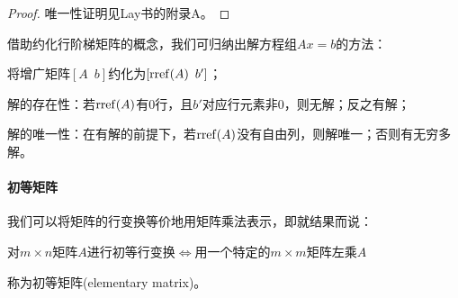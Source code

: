 \begin{proof}
	唯一性证明见Lay书的附录A。
\end{proof}

\begin{remark}
	借助约化行阶梯矩阵的概念，我们可归纳出解方程组$Ax = b$的方法：
	\begin{compactitem}
		\item 将增广矩阵$[A\enspace b]$约化为$[\operatorname{rref}(A)\enspace b']$；
		\item 解的存在性：若$\operatorname{rref}(A)$有0行，且$b'$对应行元素非0，则无解；反之有解；
		\item 解的唯一性：在有解的前提下，若$\operatorname{rref}(A)$没有自由列，则解唯一；否则有无穷多解。
	\end{compactitem}
\end{remark}

\paragraph{初等矩阵}

我们可以将矩阵的行变换等价地用矩阵乘法表示，即就结果而说：
\begin{center}
	对$m \times n$矩阵$A$进行初等行变换$\iff$用一个特定的$m \times m$矩阵左乘$A$
\end{center}
称为初等矩阵(elementary matrix)。

